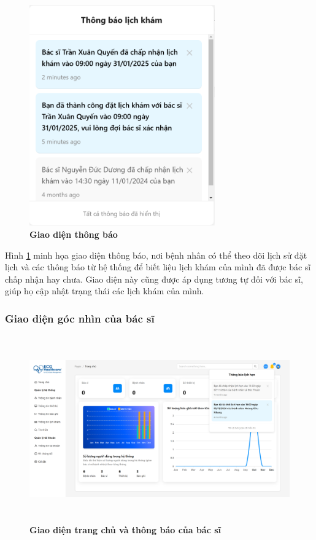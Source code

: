 \begin{figure}[H]
	\centering
	\includegraphics[width=8cm]{Images/patient_ui/noti.png}
	\caption[Giao diện thông báo]{\bfseries \fontsize{12pt}{0pt}\selectfont Giao diện thông báo}
	\label{noti-patient}
\end{figure}

Hình \ref{noti-patient} minh họa giao diện thông báo, nơi bệnh nhân có thể theo dõi lịch sử đặt lịch và các thông báo từ hệ thống để biết liệu lịch khám của mình đã được bác sĩ chấp nhận hay chưa.
Giao diện này cũng được áp dụng tương tự đối với bác sĩ, giúp họ cập nhật trạng thái các lịch khám của mình.

\subsubsection{Giao diện góc nhìn của bác sĩ}
\begin{figure}[H]
	\centering
	\includegraphics[width=15cm,height=8cm]{Images/doctor_ui/home.png}
	\caption[Giao diện trang chủ và thông báo của bác sĩ]{\bfseries \fontsize{12pt}{0pt}\selectfont Giao diện trang chủ và thông báo của bác sĩ}
	\label{home-doctor}
\end{figure}


